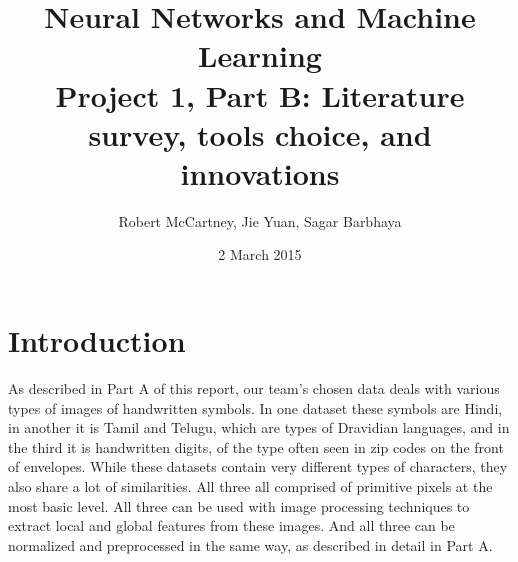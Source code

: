 \documentclass[12pt]{article}  %
\title{Neural Networks and Machine Learning \\ { \large Project 1, Part B: Literature survey, tools choice, and innovations}}
\author{
Robert McCartney, Jie Yuan, Sagar Barbhaya
}
\begin{document}
\maketitle
\date{2 March 2015}
\maketitle
\section{Introduction}
\label{Introduction}

As described in Part A of this report, our team's chosen data deals with various types of images of handwritten symbols.  In one dataset these symbols are Hindi, in another it is Tamil and Telugu, which are types of Dravidian languages, and in the third it is handwritten digits, of the type often seen in zip codes on the front of envelopes. While these datasets contain very different types of characters, they also share a lot of similarities. All three all comprised of primitive pixels at the most basic level.  All three can be used with image processing techniques to extract local and global features from these images.  And all three can be normalized and preprocessed in the same way, as described in detail in Part A. 
    
\end{document}
